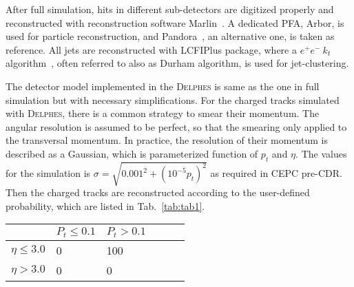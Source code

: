 \documentclass[a4paper,10pt,twoside]{cpc-hepnp}
\begin{document}

After full simulation,  hits in different sub-detectors are digitized properly and reconstructed with reconstruction software  Marlin{~\cite{ref:marlin}}.   A dedicated PFA, Arbor\cite{ref:arbor},  is used for particle reconstruction, and Pandora{~\cite{ref:pandora}}, an alternative one, is taken as reference. All jets are reconstructed with LCFIPlus package\cite{ref:lcfiplus}, where a $e^+e^-~k_t$ algorithm{~\cite{ref:eekt}},  often referred to also as {\sf Durham} algorithm,  is used for jet-clustering.

The detector model implemented in the {\textsc{Delphes}} is same as the one in full simulation but with necessary simplifications. For the charged tracks simulated with {\textsc{Delphes}}, there is a common strategy to smear their momentum. The angular resolution is assumed to be perfect, so that the smearing only applied to the transversal momentum. In practice, the resolution of their momentum is described as a Gaussian, which is parameterized function of $p_t$ and $\eta$. The values for the simulation is $\sigma=\sqrt{0.001^2+(10^{-5}p_t)^2}$ as required in CEPC pre-CDR. Then the charged tracks are  reconstructed according to the user-defined probability, which are listed in Tab.~\ref{tab:tab1}.

\begin{center}
\begin{tabular}{@{}*{3}{ll}}
\hline \hline
		& $P_t\le0.1$ & $P_t>0.1$ \\ \hline\hline
$\eta\le3.0$  & 0 		     & 100  \\
$\eta>3.0$    & 0 		     & 0 \\
\hline \hline
\end{tabular}
\end{center}
\end{document}
